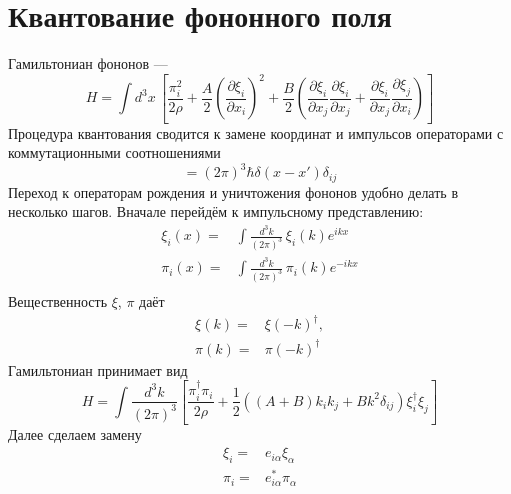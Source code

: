 \documentclass{article}
\begin{document}
\section{Квантование фононного поля}
Гамильтониан фононов ---
\begin{equation}
    H = \int d^3x\,\left[\frac{\pi_i^2}{2\rho} + 
    \frac{A}{2}\left(\frac{\partial\xi_i}{\partial x_i}\right)^2 + 
                               \frac{B}{2}\left(\frac{\partial\xi_i}{\partial x_j}
                                 \frac{\partial\xi_i}{\partial x_j} + 
                                 \frac{\partial\xi_i}{\partial x_j}
                                 \frac{\partial\xi_j}{\partial x_i}\right)\right]
\end{equation}
Процедура квантования сводится к замене координат и импульсов операторами с 
коммутационными соотношениями
\begin{equation}
    [\xi_i(x), \pi_j(x')] = (2\pi)^3\hbar\delta(x - x')\delta_{ij}
\end{equation}
Переход к операторам рождения и уничтожения фононов удобно делать в несколько шагов.
Вначале перейдём к импульсному представлению:
\begin{equation}
    \begin{split}
        \xi_i(x) = &  \int \frac{d^3 k}{(2\pi)^3}\, \xi_i(k) e^{ikx} \\
        \pi_i(x) = &  \int \frac{d^3 k}{(2\pi)^3}\, \pi_i(k) e^{-ikx} \\
    \end{split}
\end{equation}
Вещественность $\xi$, $\pi$ даёт
\begin{equation}
    \begin{split}
        \xi(k) = & \xi(-k)^\dagger,\\
        \pi(k) = & \pi(-k)^\dagger
    \end{split}
\end{equation}
Гамильтониан принимает вид
\begin{equation}
    H = \int \frac{d^3 k}{(2\pi)^3} \left[ \frac{\pi_i^\dagger \pi_i}{2\rho} + 
                         \frac{1}{2}((A + B)k_i k_j + Bk^2\delta_{ij})\xi_i^\dagger\xi_j
                                        \right]
\end{equation}
Далее сделаем замену 
\begin{equation}
    \begin{split}
        \xi_i = & e_{i\alpha} \xi_\alpha\\
        \pi_i = & e_{i\alpha}^* \pi_\alpha
    \end{split}
\end{equation}
\end{document}
